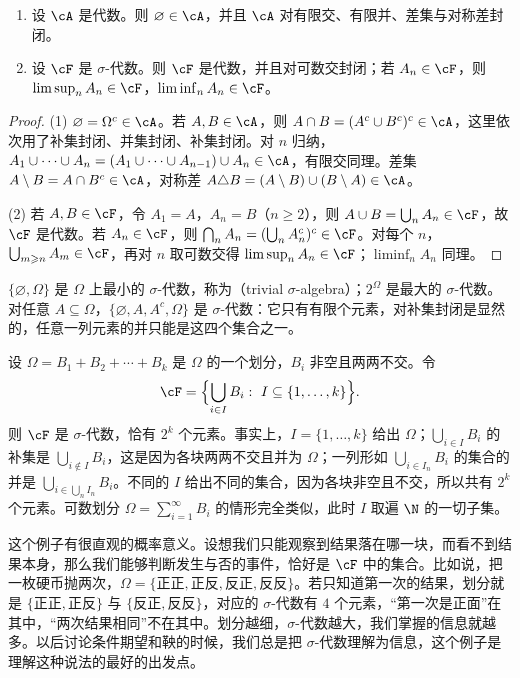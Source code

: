 \begin{proposition}\label{prop:set-systems:closure}
\begin{enumerate}
\item 设 $\cA$ 是代数。则 $\varnothing\in\cA$，并且 $\cA$ 对有限交、有限并、差集与对称差封闭。
\item 设 $\cF$ 是 $\sigma$-代数。则 $\cF$ 是代数，并且对可数交封闭；若 $A_n\in\cF$，则 $\limsup_nA_n\in\cF$，$\liminf_nA_n\in\cF$。
\end{enumerate}
\end{proposition}
\begin{proof}
(1) $\varnothing=\Omega^c\in\cA$。若 $A,B\in\cA$，则 $A\cap B=(A^c\cup B^c)^c\in\cA$，这里依次用了补集封闭、并集封闭、补集封闭。对 $n$ 归纳，$A_1\cup\cdots\cup A_n=(A_1\cup\cdots\cup A_{n-1})\cup A_n\in\cA$，有限交同理。差集 $A\setminus B=A\cap B^c\in\cA$，对称差 $A\triangle B=(A\setminus B)\cup(B\setminus A)\in\cA$。

(2) 若 $A,B\in\cF$，令 $A_1=A$，$A_n=B$（$n\geqslant2$），则 $A\cup B=\bigcup_nA_n\in\cF$，故 $\cF$ 是代数。若 $A_n\in\cF$，则 $\bigcap_nA_n=(\bigcup_nA_n^c)^c\in\cF$。对每个 $n$，$\bigcup_{m\geqslant n}A_m\in\cF$，再对 $n$ 取可数交得 $\limsup_nA_n\in\cF$；$\liminf_nA_n$ 同理。
\end{proof}

\begin{example}
$\{\varnothing,\Omega\}$ 是 $\Omega$ 上最小的 $\sigma$-代数，称为（trivial $\sigma$-algebra）；$2^\Omega$ 是最大的 $\sigma$-代数。对任意 $A\subseteq\Omega$，$\{\varnothing,A,A^c,\Omega\}$ 是 $\sigma$-代数：它只有有限个元素，对补集封闭是显然的，任意一列元素的并只能是这四个集合之一。
\end{example}

\begin{example}\label{ex:set-systems:partition}
设 $\Omega=B_1+B_2+\cdots+B_k$ 是 $\Omega$ 的一个划分，$B_i$ 非空且两两不交。令
\[
\cF=\Bigl\{\bigcup_{i\in I}B_i:\ I\subseteq\{1,\dots,k\}\Bigr\}.
\]
则 $\cF$ 是 $\sigma$-代数，恰有 $2^k$ 个元素。事实上，$I=\{1,\dots,k\}$ 给出 $\Omega$；$\bigcup_{i\in I}B_i$ 的补集是 $\bigcup_{i\notin I}B_i$，这是因为各块两两不交且并为 $\Omega$；一列形如 $\bigcup_{i\in I_n}B_i$ 的集合的并是 $\bigcup_{i\in\bigcup_nI_n}B_i$。不同的 $I$ 给出不同的集合，因为各块非空且不交，所以共有 $2^k$ 个元素。可数划分 $\Omega=\sum_{i=1}^\infty B_i$ 的情形完全类似，此时 $I$ 取遍 $\N$ 的一切子集。

这个例子有很直观的概率意义。设想我们只能观察到结果落在哪一块，而看不到结果本身，那么我们能够判断发生与否的事件，恰好是 $\cF$ 中的集合。比如说，把一枚硬币抛两次，$\Omega=\{\text{正正},\text{正反},\text{反正},\text{反反}\}$。若只知道第一次的结果，划分就是 $\{\text{正正},\text{正反}\}$ 与 $\{\text{反正},\text{反反}\}$，对应的 $\sigma$-代数有 $4$ 个元素，“第一次是正面”在其中，“两次结果相同”不在其中。划分越细，$\sigma$-代数越大，我们掌握的信息就越多。以后讨论条件期望和鞅的时候，我们总是把 $\sigma$-代数理解为信息，这个例子是理解这种说法的最好的出发点。
\end{example}

